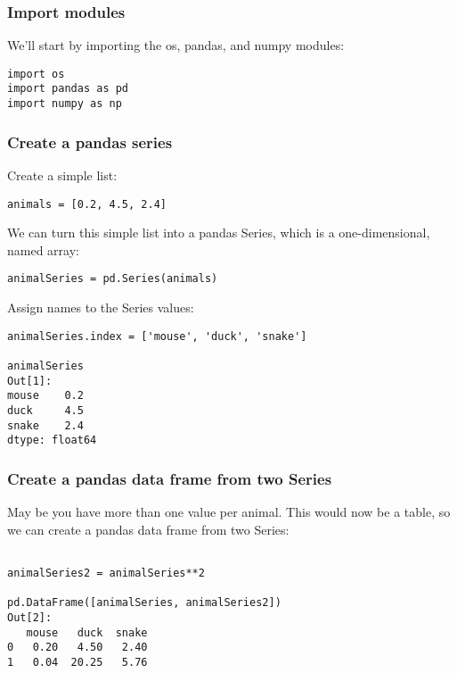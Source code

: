 \documentclass[12pt]{article}
\begin{document}
\subsubsection{Import modules}
We'll start by importing the os, pandas, and numpy modules:
\begin{verbatim}
import os
import pandas as pd
import numpy as np

\end{verbatim}
\subsubsection{Create a pandas series}
Create a simple list:
\begin{verbatim}
animals = [0.2, 4.5, 2.4]

\end{verbatim}
We can turn this simple list into a pandas Series, which is a one-dimensional, named array:
\begin{verbatim}
animalSeries = pd.Series(animals)

\end{verbatim}
Assign names to the Series values:
\begin{verbatim}
animalSeries.index = ['mouse', 'duck', 'snake']

animalSeries
Out[1]: 
mouse    0.2
duck     4.5
snake    2.4
dtype: float64

\end{verbatim}
\subsubsection{Create a pandas data frame from two Series}
May be you have more than one value per animal. This would now be a table, so we can create a pandas data frame from two Series:
\begin{verbatim}

animalSeries2 = animalSeries**2

pd.DataFrame([animalSeries, animalSeries2])
Out[2]: 
   mouse   duck  snake
0   0.20   4.50   2.40
1   0.04  20.25   5.76

\end{verbatim}
\end{document}
